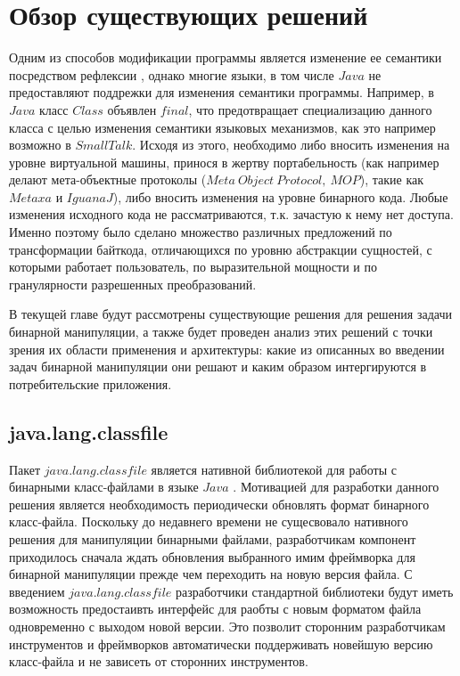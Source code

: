 \section{Обзор существующих решений}
\label{sec:Chapter2} 

Одним из способов модификации программы является изменение ее семантики посредством рефлексии \cite{compReflection}, однако многие языки, в том числе $Java$ не предоставляют поддрежки для изменения семантики программы. Например, в $Java$ класс $Class$ объявлен $final$, что предотвращает специализацию данного класса с целью изменения семантики языковых механизмов, как это например возможно в $SmallTalk$. Исходя из этого, необходимо либо вносить изменения на уровне виртуальной машины, принося в жертву портабельность (как например делают мета-объектные протоколы ($Meta~Object~Protocol,~MOP$), такие как $Metaxa$ и $IguanaJ$), либо вносить изменения на уровне бинарного кода. Любые изменения исходного кода не рассматриваются, т.к. зачастую к нему нет доступа. Именно поэтому было сделано множество различных предложений по трансформации байткода, отличающихся по уровню абстракции сущностей, с которыми работает пользователь, по выразительной мощности и по гранулярности разрешенных преобразований.

В текущей главе будут рассмотрены существующие решения для решения задачи бинарной манипуляции, а также будет проведен анализ этих решений с точки зрения их области применения и архитектуры: какие из описанных во введении задач бинарной манипуляции они решают и каким образом интергируются в потребительские приложения.

\subsection{java.lang.classfile}

Пакет $java.lang.classfile$ является нативной библиотекой для работы с бинарными класс-файлами в языке $Java$ \cite{lavaLangClassfile}. Мотивацией для разработки данного решения является необходимость периодически обновлять формат бинарного класс-файла. Поскольку до недавнего времени не сущесвовало нативного решения для манипуляции бинарными файлами, разработчикам компонент приходилось сначала ждать обновления выбранного имим фреймворка для бинарной манипуляции прежде чем переходить на новую версия файла. С введением $java.lang.classfile$ разработчики стандартной библиотеки будут иметь возможность предостаивть интерфейс для раобты с новым форматом файла одновременно с выходом новой версии. Это позволит сторонним разработчикам инструментов и фреймворков автоматически поддерживать новейшую версию класс-файла и не зависеть от сторонних инструментов.

